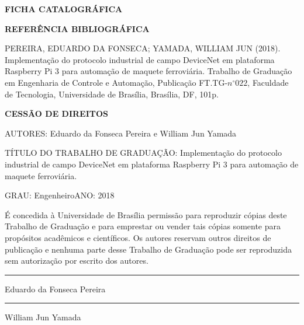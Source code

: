 \noindent \textbf{FICHA CATALOGRÁFICA}

\noindent %

\noindent \medskip{}


\noindent \textbf{REFERÊNCIA BIBLIOGRÁFICA}

PEREIRA, EDUARDO DA FONSECA; YAMADA, WILLIAM JUN (2018). Implementação do protocolo industrial de campo DeviceNet em plataforma Raspberry Pi 3 para automação de maquete ferroviária. Trabalho de Graduação
em Engenharia de Controle e Automação, Publicação FT.TG-$n^{\circ}022$,
Faculdade de Tecnologia, Universidade de Brasília, Brasília, DF, 101p.

\noindent \bigskip{}


\noindent \textbf{CESSÃO DE DIREITOS}

\noindent AUTORES: Eduardo da Fonseca Pereira e William Jun Yamada

TÍTULO DO TRABALHO DE GRADUAÇÃO: Implementação do protocolo industrial de campo DeviceNet em plataforma Raspberry Pi 3 para automação de maquete ferroviária.

\noindent \medskip{}


\noindent GRAU: Engenheiro\hfill{}ANO: 2018\hfill{}

\noindent \medskip{}


É concedida à Universidade de Brasília permissão para reproduzir cópias
deste Trabalho de Graduação e para emprestar ou vender tais cópias
somente para propósitos acadêmicos e científicos. Os autores reservam
outros direitos de publicação e nenhuma parte desse Trabalho de Graduação
pode ser reproduzida sem autorização por escrito dos autores.

\noindent \bigskip{}


\noindent \rule[0.5ex]{1\columnwidth}{1pt}

\noindent Eduardo da Fonseca Pereira

\bigskip

\noindent \rule[0.5ex]{1\columnwidth}{1pt}

\noindent William Jun Yamada